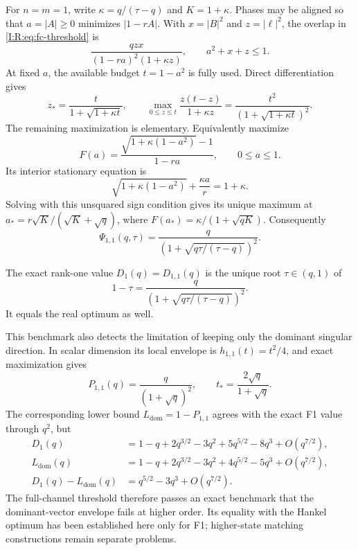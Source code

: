 For $n=m=1$, write $\kappa=q/(\tau-q)$ and $K=1+\kappa$. Phases may be aligned
so that $a=|A|\ge0$ minimizes $|1-rA|$. With $x=|B|^2$ and $z=|\ell|^2$,
the overlap in \eqref{I:R:eq:fc-threshold} is
\[
 \frac{qzx}{(1-ra)^2(1+\kappa z)},\qquad a^2+x+z\le1.
\]
At fixed $a$, the available budget $t=1-a^2$ is fully used. Direct
differentiation gives
\[
 z_* =\frac{t}{1+\sqrt{1+\kappa t}},\qquad
 \max_{0\le z\le t}\frac{z(t-z)}{1+\kappa z}
       =\frac{t^2}{(1+\sqrt{1+\kappa t})^2}.
\]
The remaining maximization is elementary. Equivalently maximize
\[
 F(a)=\frac{\sqrt{1+\kappa(1-a^2)}-1}{1-ra},\qquad0\le a\le1.
\]
Its interior stationary equation is
\[
 \sqrt{1+\kappa(1-a^2)}+\frac{\kappa a}{r}=1+\kappa.
\]
Solving with this unsquared sign condition gives its unique maximum at
$a_*=r\sqrt K/(\sqrt K+\sqrt q)$, where
$F(a_*)=\kappa/(1+\sqrt{qK})$. Consequently
\begin{equation}
 \boxed{\Psi_{1,1}(q,\tau)
      =\frac{q}{\left(1+\sqrt{q\tau/(\tau-q)}\right)^2}.}
 \label{I:R:eq:fc-scalar-Psi}
\end{equation}

\begin{theorem}
\label{I:R:thm:fc-F1-radical}
The exact rank-one value $D_1(q)=D_{1,1}(q)$ is the unique root $\tau\in(q,1)$
of
\begin{equation}
 \boxed{1-\tau
       =\frac{q}{\left(1+\sqrt{q\tau/(\tau-q)}\right)^2}.}
 \label{I:R:eq:fc-F1-root}
\end{equation}
It equals the real optimum as well.
\end{theorem}


This benchmark also detects the limitation of keeping only the dominant
singular direction. In scalar dimension its local envelope is
$h_{1,1}(t)=t^2/4$, and exact maximization gives
\[
 P_{1,1}(q)=\frac{q}{(1+\sqrt q)^2},\qquad
 t_* =\frac{2\sqrt q}{1+\sqrt q}.
\]
The corresponding lower bound $L_{\mathrm{dom}}=1-P_{1,1}$ agrees with the
exact F1 value through $q^2$, but
\begin{align*}
 D_1(q)&=1-q+2q^{3/2}-3q^2+5q^{5/2}-8q^3+O(q^{7/2}),\\
 L_{\mathrm{dom}}(q)&=1-q+2q^{3/2}-3q^2+4q^{5/2}-5q^3+O(q^{7/2}),\\
 D_1(q)-L_{\mathrm{dom}}(q)&=q^{5/2}-3q^3+O(q^{7/2}).
\end{align*}
The full-channel threshold therefore passes an exact benchmark that the
dominant-vector envelope fails at higher order. Its equality with the Hankel
optimum has been established here only for F1; higher-state matching
constructions remain separate problems.

